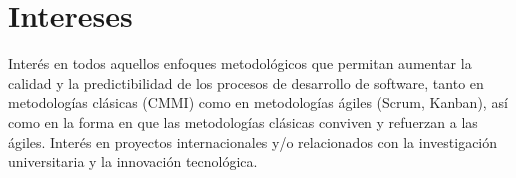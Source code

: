 \documentclass[letterpaper]{twentysecondcv} %
\begin{document}







\makeprofile %


\section{Intereses}

Interés en todos aquellos enfoques metodológicos que permitan aumentar la calidad y la predictibilidad de los procesos de desarrollo de software, tanto en metodologías clásicas (CMMI) como en metodologías ágiles (Scrum, Kanban), así como en la forma en que las metodologías clásicas conviven y refuerzan a las ágiles.
Interés en proyectos internacionales y/o relacionados con la investigación universitaria y la innovación tecnológica.
\end{document}
